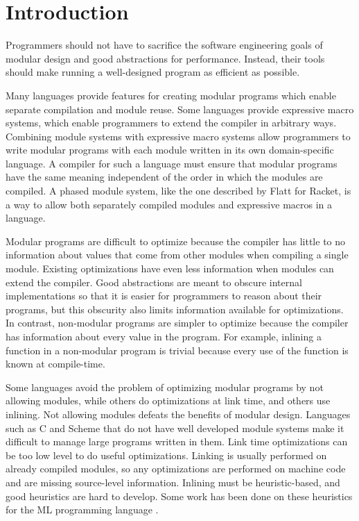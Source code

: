 \chapter{Introduction}
\label{chap:introduction}

Programmers should not have to sacrifice the software engineering goals of modular design and good abstractions for performance. 
Instead, their tools should make running a well-designed program as efficient as possible. 

Many languages provide features for creating modular programs which enable separate compilation and module reuse.
Some languages provide expressive macro systems, which enable programmers to extend the compiler in arbitrary ways.
Combining module systems with expressive macro systems allow programmers to write modular programs with each module written in its own domain-specific language.
A compiler for such a language must ensure that modular programs have the same meaning independent of the order in which the modules are compiled.
A phased module system, like the one described by Flatt \cite{Flatt} for Racket, is a way to allow both separately compiled modules and expressive macros in a language.

Modular programs are difficult to optimize because the compiler has little to no information about values that come from other modules when compiling a single module.
Existing optimizations have even less information when modules can extend the compiler. 
Good abstractions are meant to obscure internal implementations so that it is easier for programmers to reason about their programs, but this obscurity also limits information available for optimizations.  
In contrast, non-modular programs are simpler to optimize because the compiler has information about every value in the program.
For example, inlining a function in a non-modular program is trivial because every use of the function is known at compile-time.

Some languages avoid the problem of optimizing modular programs by not allowing modules, while others do optimizations at link time, and others use inlining. 
Not allowing modules defeats the benefits of modular design. 
Languages such as C and Scheme that do not have well developed module systems make it difficult to manage large programs written in them.
Link time optimizations can be too low level to do useful optimizations.
Linking is usually performed on already compiled modules, so any optimizations are performed on machine code and are missing source-level information.
Inlining must be heuristic-based, and good heuristics are hard to develop. 
Some work has been done on these heuristics for the ML programming language \cite{}.


